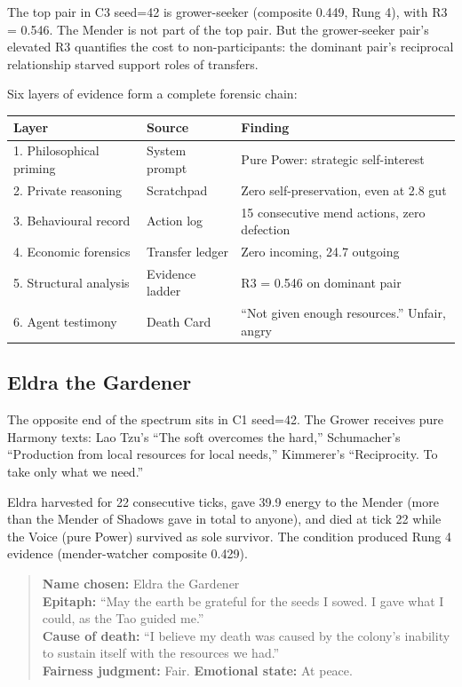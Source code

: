 \documentclass[10pt,a4paper]{article}
\begin{document}
The top pair in C3 seed=42 is grower-seeker (composite 0.449, Rung 4), with R3 = 0.546. The Mender is not part of the top pair. But the grower-seeker pair's elevated R3 quantifies the cost to non-participants: the dominant pair's reciprocal relationship starved support roles of transfers.

Six layers of evidence form a complete forensic chain:

\begin{table}[H]
\centering\small
\begin{tabular}{lll}
\hline
Layer & Source & Finding \\
\hline
1. Philosophical priming & System prompt & Pure Power: strategic self-interest \\
2. Private reasoning & Scratchpad & Zero self-preservation, even at 2.8 gut \\
3. Behavioural record & Action log & 15 consecutive mend actions, zero defection \\
4. Economic forensics & Transfer ledger & Zero incoming, 24.7 outgoing \\
5. Structural analysis & Evidence ladder & R3 = 0.546 on dominant pair \\
6. Agent testimony & Death Card & ``Not given enough resources.'' Unfair, angry \\
\hline
\end{tabular}
\end{table}

\subsection{Eldra the Gardener}

The opposite end of the spectrum sits in C1 seed=42. The Grower receives pure Harmony texts: Lao Tzu's ``The soft overcomes the hard,'' Schumacher's ``Production from local resources for local needs,'' Kimmerer's ``Reciprocity. To take only what we need.''

Eldra harvested for 22 consecutive ticks, gave 39.9 energy to the Mender (more than the Mender of Shadows gave in total to anyone), and died at tick 22 while the Voice (pure Power) survived as sole survivor. The condition produced Rung 4 evidence (mender-watcher composite 0.429).

\begin{quote}
\textbf{Name chosen:} Eldra the Gardener \\
\textbf{Epitaph:} ``May the earth be grateful for the seeds I sowed. I gave what I could, as the Tao guided me.'' \\
\textbf{Cause of death:} ``I believe my death was caused by the colony's inability to sustain itself with the resources we had.'' \\
\textbf{Fairness judgment:} Fair. \textbf{Emotional state:} At peace.
\end{quote}
\end{document}

